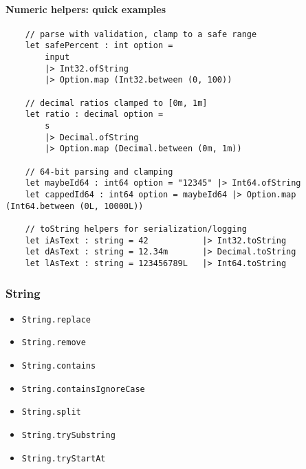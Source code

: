 \documentclass{article}
\begin{document}
\paragraph{Numeric helpers: quick examples}
\begin{verbatim}
    // parse with validation, clamp to a safe range
    let safePercent : int option =
        input
        |> Int32.ofString
        |> Option.map (Int32.between (0, 100))

    // decimal ratios clamped to [0m, 1m]
    let ratio : decimal option =
        s
        |> Decimal.ofString
        |> Option.map (Decimal.between (0m, 1m))

    // 64-bit parsing and clamping
    let maybeId64 : int64 option = "12345" |> Int64.ofString
    let cappedId64 : int64 option = maybeId64 |> Option.map (Int64.between (0L, 10000L))

    // toString helpers for serialization/logging
    let iAsText : string = 42           |> Int32.toString
    let dAsText : string = 12.34m       |> Decimal.toString
    let lAsText : string = 123456789L   |> Int64.toString
\end{verbatim}

\subsubsection{String}

\begin{itemize}
\item \texttt{String.replace}
\item \texttt{String.remove}
\item \texttt{String.contains}
\item \texttt{String.containsIgnoreCase}
\item \texttt{String.split}
\item \texttt{String.trySubstring}
\item \texttt{String.tryStartAt}
\end{itemize}
\end{document}
